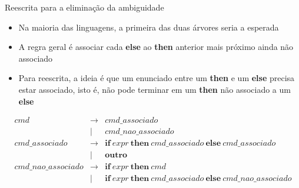 \begin{frame}[fragile]{Reescrita para a eliminação da ambiguidade}

    \begin{itemize}
        \item Na maioria das linguagens, a primeira das duas árvores seria a esperada

        \item A regra geral é associar cada \textbf{else} ao \textbf{then} anterior mais próximo ainda não associado

        \item Para reescrita, a ideia é que um enunciado entre um \textbf{then} e um \textbf{else} precisa estar associado, isto é, não pode terminar em um
            \textbf{then} não associado a um \textbf{else}
    \end{itemize}

    \[
        \begin{array}{rcl}
            cmd & \to & cmd\_associado \\
                & | & cmd\_nao\_associado \\
            cmd\_associado & \to & \textbf{if}\ expr\ \textbf{then}\ cmd\_associado\ \textbf{else}\ cmd\_associado \\
            & | & \textbf{outro} \\
            cmd\_nao\_associado & \to & \textbf{if}\ expr\ \textbf{then}\ cmd \\
            & | & \textbf{if}\ expr\ \textbf{then}\ cmd\_associado\ \textbf{else}\ cmd\_nao\_associado
        \end{array}
    \]
\end{frame}

